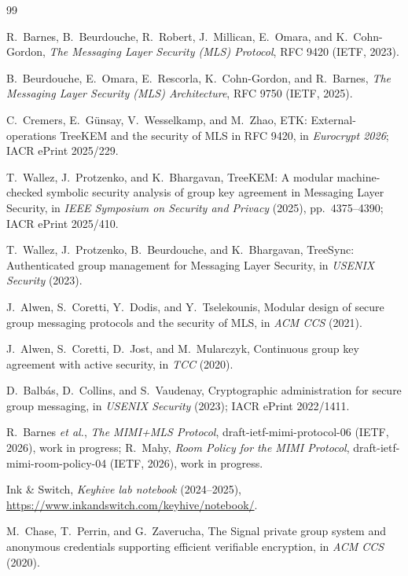 \documentclass[aps,prx,reprint,superscriptaddress,nofootinbib,floatfix]{revtex4-2}
\theoremstyle{remark}
\begin{document}
\clearpage
\begin{thebibliography}{99}

 R.~Barnes, B.~Beurdouche, R.~Robert, J.~Millican, E.~Omara, and K.~Cohn-Gordon, \emph{The Messaging Layer Security (MLS) Protocol}, RFC 9420 (IETF, 2023).

 B.~Beurdouche, E.~Omara, E.~Rescorla, K.~Cohn-Gordon, and R.~Barnes, \emph{The Messaging Layer Security (MLS) Architecture}, RFC 9750 (IETF, 2025).

 C.~Cremers, E.~G\"unsay, V.~Wesselkamp, and M.~Zhao, ETK: External-operations TreeKEM and the security of MLS in RFC 9420, in \emph{Eurocrypt 2026}; IACR ePrint 2025/229.

 T.~Wallez, J.~Protzenko, and K.~Bhargavan, TreeKEM: A modular machine-checked symbolic security analysis of group key agreement in Messaging Layer Security, in \emph{IEEE Symposium on Security and Privacy} (2025), pp.~4375--4390; IACR ePrint 2025/410.

 T.~Wallez, J.~Protzenko, B.~Beurdouche, and K.~Bhargavan, TreeSync: Authenticated group management for Messaging Layer Security, in \emph{USENIX Security} (2023).

 J.~Alwen, S.~Coretti, Y.~Dodis, and Y.~Tselekounis, Modular design of secure group messaging protocols and the security of MLS, in \emph{ACM CCS} (2021).

 J.~Alwen, S.~Coretti, D.~Jost, and M.~Mularczyk, Continuous group key agreement with active security, in \emph{TCC} (2020).

 D.~Balb\'as, D.~Collins, and S.~Vaudenay, Cryptographic administration for secure group messaging, in \emph{USENIX Security} (2023); IACR ePrint 2022/1411.

 R.~Barnes \emph{et al.}, \emph{The MIMI+MLS Protocol}, draft-ietf-mimi-protocol-06 (IETF, 2026), work in progress; R.~Mahy, \emph{Room Policy for the MIMI Protocol}, draft-ietf-mimi-room-policy-04 (IETF, 2026), work in progress.

 Ink \& Switch, \emph{Keyhive lab notebook} (2024--2025), \url{https://www.inkandswitch.com/keyhive/notebook/}.

 M.~Chase, T.~Perrin, and G.~Zaverucha, The Signal private group system and anonymous credentials supporting efficient verifiable encryption, in \emph{ACM CCS} (2020).


\end{thebibliography}
\end{document}
